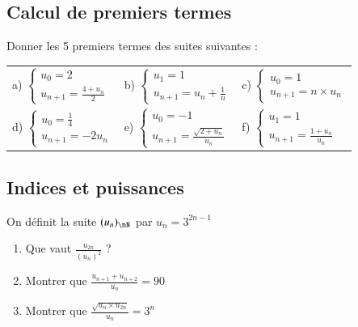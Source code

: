 \documentclass[oneside,12pt]{article}          %
\begin{document}
\subsection{Calcul de premiers termes}
Donner les 5 premiers termes des suites suivantes :\\
\renewcommand{\arraystretch}{2}
\begin{tabular}{p{} p{} p{}}

    a) $\begin{cases}u_{0} = 2\\u_{n+1}=\frac{4+u_{n}}{2}\end{cases} $
    &
    b) $\begin{cases}u_{1} = 1\\u_{n+1}=u_n+\frac{1}{n}\end{cases} $
    &
    c) $\begin{cases}u_{0} = 1\\u_{n+1}=n\times u_n\end{cases} $ \\

    d) $\begin{cases}u_{0} = \frac{1}{4}\\u_{n+1}=-2u_n\end{cases} $
    &
    e) $\begin{cases}u_{0} = -1\\u_{n+1}=\frac{\sqrt{2+u_n}}{u_n}\end{cases} $
    &
    f) $\begin{cases}u_{1}=1\\u_{n+1}=\frac{1+u_{n}}{u_{n}}\end{cases}$ 
\end{tabular}



\subsection{Indices et puissances}
On définit la suite $(u_n)_{\nN}$ par $u_n=3^{2n-1}$
\begin{enumerate}
	\item Que vaut $\frac{u_{2n}}{(u_n)^2}$ ?
	\item Montrer que $\frac{u_{n+1}+u_{n+2}}{u_n}=90$
	\item Montrer que $\frac{\sqrt{u_n\times u_{2n}}}{u_n}=3^n$
\end{enumerate}
\end{document}
